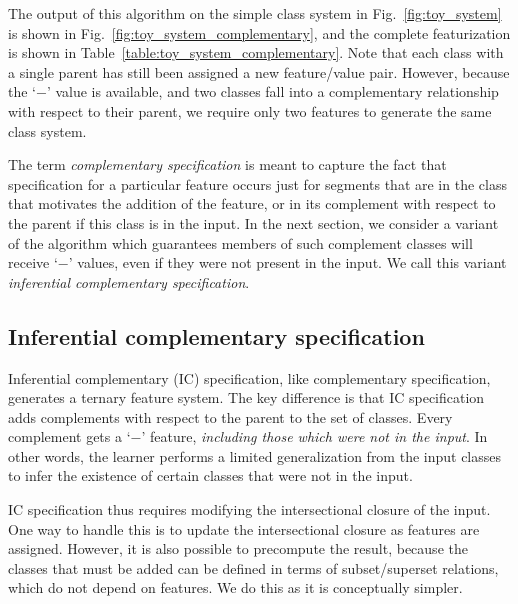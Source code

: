 \documentclass[12pt, oneside]{article}   	%
\begin{document}
The output of this algorithm on the simple class system in Fig.~\ref{fig:toy_system} is shown in Fig.~\ref{fig:toy_system_complementary}, and the complete featurization is shown in Table~\ref{table:toy_system_complementary}. Note that each class with a single parent has still been assigned a new feature/value pair. However, because the `$-$' value is available, and two classes fall into a complementary relationship with respect to their parent, we require only two features to generate the same class system.

The term \textit{complementary specification} is meant to capture the fact that specification for a particular feature occurs just for segments that are in the class that motivates the addition of the feature, or in its complement with respect to the parent if this class is in the input. In the next section, we consider a variant of the algorithm which guarantees members of such complement classes will receive `$-$' values, even if they were not present in the input. We call this variant \textit{inferential complementary specification}.

\FloatBarrier
\subsection{Inferential complementary specification}
\label{sec:contrastive}

Inferential complementary (IC) specification, like complementary specification, generates a ternary feature system. The key difference is that IC specification adds complements with respect to the parent to the set of classes. Every complement gets a `$-$' feature, \textit{including those which were not in the input}. In other words, the learner performs a limited generalization from the input classes to infer the existence of certain classes that were not in the input.

IC specification thus requires modifying the intersectional closure of the input. One way to handle this is to update the intersectional closure as features are assigned. However, it is also possible to precompute the result, because the classes that must be added can be defined in terms of subset/superset relations, which do not depend on features. We do this as it is conceptually simpler.
\end{document}
